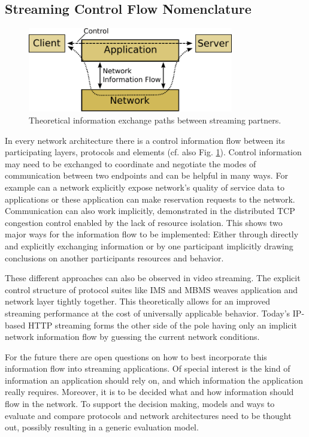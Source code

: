 \subsection{Streaming Control Flow Nomenclature}


\begin{figure}[htbp]
\centering
\includegraphics[width=0.8\textwidth]{images/nif.pdf}
\caption{Theoretical information exchange paths between streaming partners.}
\label{c3:fig:nif}
\end{figure}

In every network architecture there is a control information flow between its participating layers, protocols and elements (cf. also Fig. \ref{c3:fig:nif}). Control information may need to be exchanged to coordinate and negotiate the modes of communication between two endpoints and can be helpful in many ways. For example can a network explicitly expose network's quality of service data to applications or these application can make reservation requests to the network. Communication can also work implicitly, demonstrated in the distributed TCP congestion control enabled by the lack of resource isolation. This shows two major ways for the information flow to be implemented: Either through directly and explicitly exchanging information or by one participant implicitly drawing conclusions on another participants resources and behavior.

These different approaches can also be observed in video streaming. The explicit control structure of protocol suites like IMS\cite{3gpp.23.228} and MBMS weaves application and network layer tightly together. This theoretically allows for an improved streaming performance at the cost of universally applicable behavior. Today's IP-based HTTP streaming forms the other side of the pole having only an implicit network information flow by guessing the current network conditions.

For the future there are open questions on how to best incorporate this information flow into streaming applications. Of special interest is the kind of information an application should rely on, and which information the application really requires. Moreover, it is to be decided what and how information should flow in the network. To support the decision making, models and ways to evaluate and compare protocols and network architectures need to be thought out, possibly resulting in a generic evaluation model.

